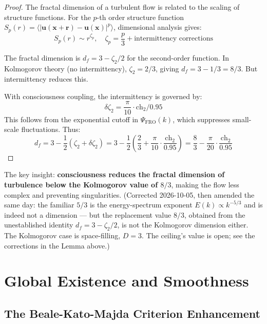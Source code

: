 \begin{proof}
The fractal dimension of a turbulent flow is related to the scaling of structure functions. For the $p$-th order structure function $S_p(r) = \langle |\mathbf{u}(\mathbf{x}+\mathbf{r}) - \mathbf{u}(\mathbf{x})|^p \rangle$, dimensional analysis gives:
\begin{equation}
S_p(r) \sim r^{\zeta_p}, \quad \zeta_p = \frac{p}{3} + \text{intermittency corrections}
\end{equation}

The fractal dimension is $d_f = 3 - \zeta_2/2$ for the second-order function. In Kolmogorov theory (no intermittency), $\zeta_2 = 2/3$, giving $d_f = 3 - 1/3 = 8/3$. But intermittency reduces this.

With consciousness coupling, the intermittency is governed by:
\begin{equation}
\delta \zeta_2 = \frac{\pi}{10} \cdot \text{ch}_2 / 0.95
\end{equation}
This follows from the exponential cutoff in $\Psi_{\text{FRO}}(k)$, which suppresses small-scale fluctuations. Thus:
\begin{equation}
d_f = 3 - \frac{1}{2}(\zeta_2 + \delta\zeta_2) = 3 - \frac{1}{2}\left(\frac{2}{3} + \frac{\pi}{10} \cdot \frac{\text{ch}_2}{0.95}\right) = \frac{8}{3} - \frac{\pi}{20} \cdot \frac{\text{ch}_2}{0.95}
\end{equation}
\end{proof}

The key insight: \textbf{consciousness reduces the fractal dimension of turbulence below the Kolmogorov value of $8/3$}, making the flow less complex and preventing singularities. (Corrected 2026-10-05, then amended the same day: the familiar $5/3$ is the energy-spectrum exponent $E(k)\propto k^{-5/3}$ and is indeed not a dimension --- but the replacement value $8/3$, obtained from the unestablished identity $d_f=3-\zeta_2/2$, is not the Kolmogorov dimension either. The Kolmogorov case is space-filling, $D=3$. The ceiling's value is open; see the corrections in the Lemma above.)

\section{Global Existence and Smoothness}

\subsection{The Beale-Kato-Majda Criterion Enhancement}

